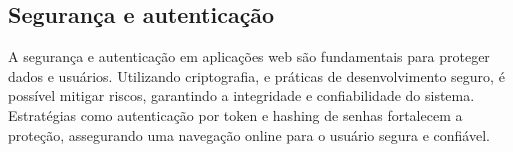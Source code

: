 
\subsection{Segurança e autenticação}
A segurança e autenticação em aplicações web são fundamentais para proteger dados e usuários. Utilizando criptografia,  e práticas de desenvolvimento seguro, é possível mitigar riscos, garantindo a integridade e confiabilidade do sistema. Estratégias como autenticação por token e hashing de senhas fortalecem a proteção, assegurando uma navegação online para o usuário segura e confiável.\cite{segurancaeauth}

